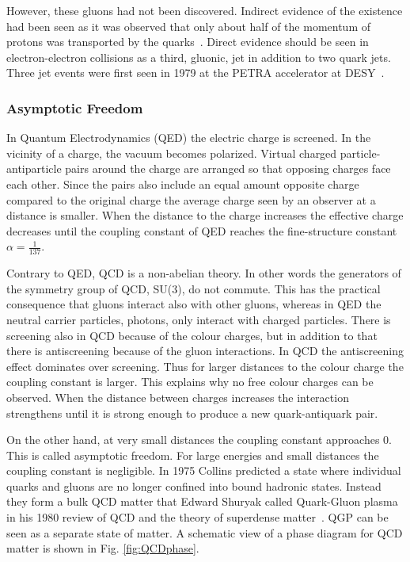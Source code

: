 However, these gluons had not been discovered. Indirect evidence of the existence had been seen as it was observed that only about half of the momentum of protons was transported by the quarks~\cite{25gluons}. Direct evidence should be seen in electron-electron collisions as a third, gluonic, jet in addition to two quark jets. Three jet events were first seen in 1979 at the PETRA accelerator at DESY~\cite{Brandelik1979243, PhysRev.43.830, Berger1979418}.

\subsubsection{Asymptotic Freedom}
In Quantum Electrodynamics (QED) the electric charge is screened. In the vicinity of a charge, the vacuum becomes polarized. Virtual charged particle-antiparticle pairs around the charge are arranged so that opposing charges face each other. Since the pairs also include an equal amount opposite charge compared to the original charge the average charge seen by an observer at a distance is smaller. When the distance to the charge increases the effective charge decreases until the coupling constant of QED reaches the fine-structure constant $\alpha=\frac{1}{137}$. 

Contrary to QED, QCD is a non-abelian theory. In other words the generators of the symmetry group of QCD, SU(3), do not commute. This has the practical consequence that gluons interact also with other gluons, whereas in QED the neutral carrier particles, photons, only interact with charged particles.
There is screening also in QCD because of the colour charges, but in addition to that there is antiscreening because of the gluon interactions. In QCD the antiscreening effect dominates over screening. Thus for larger distances to the colour charge the coupling constant is larger. This explains why no free colour charges can be observed. When the distance between charges increases the interaction strengthens until it is strong enough to produce a new quark-antiquark pair. 

On the other hand, at very small distances the coupling constant approaches 0. This is called asymptotic freedom. For large energies and small distances the coupling constant is negligible. In 1975 Collins\cite{Collins:1975} predicted a state where individual quarks and gluons are no longer confined into bound hadronic states. Instead they form a bulk QCD matter that Edward Shuryak called Quark-Gluon plasma in his 1980 review of QCD and the theory of superdense matter~\cite{Shuryak:1980}. QGP can be seen as a separate state of matter. A schematic view of a phase diagram for QCD matter is shown in Fig. \ref{fig:QCDphase}. 

